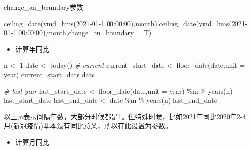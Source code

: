 \documentclass[
]{book}
\newenvironment{Shaded}{\begin{snugshade}}{\end{snugshade}}
\newcommand{\AttributeTok}[1]{\textcolor[rgb]{0.77,0.63,0.00}{#1}}
\newcommand{\CommentTok}[1]{\textcolor[rgb]{0.56,0.35,0.01}{\textit{#1}}}
\newcommand{\DecValTok}[1]{\textcolor[rgb]{0.00,0.00,0.81}{#1}}
\newcommand{\FunctionTok}[1]{\textcolor[rgb]{0.00,0.00,0.00}{#1}}
\newcommand{\NormalTok}[1]{#1}
\newcommand{\OtherTok}[1]{\textcolor[rgb]{0.56,0.35,0.01}{#1}}
\newcommand{\SpecialCharTok}[1]{\textcolor[rgb]{0.00,0.00,0.00}{#1}}
\newcommand{\StringTok}[1]{\textcolor[rgb]{0.31,0.60,0.02}{#1}}
\providecommand{\tightlist}{%
  \setlength{\itemsep}{0pt}\setlength{\parskip}{0pt}}
\begin{document}
change\_on\_boundary参数

\begin{Shaded}
\begin{Highlighting}[]
\FunctionTok{ceiling\_date}\NormalTok{(}\FunctionTok{ymd\_hms}\NormalTok{(}\StringTok{\textquotesingle{}2021{-}01{-}1 00:00:00\textquotesingle{}}\NormalTok{),}\StringTok{\textquotesingle{}month\textquotesingle{}}\NormalTok{)}
\FunctionTok{ceiling\_date}\NormalTok{(}\FunctionTok{ymd\_hms}\NormalTok{(}\StringTok{\textquotesingle{}2021{-}01{-}1 00:00:00\textquotesingle{}}\NormalTok{),}\StringTok{\textquotesingle{}month\textquotesingle{}}\NormalTok{,}\AttributeTok{change\_on\_boundary =}\NormalTok{ T)}
\end{Highlighting}
\end{Shaded}

\begin{itemize}
\tightlist
\item
  计算年同比
\end{itemize}

\begin{Shaded}
\begin{Highlighting}[]
\NormalTok{n }\OtherTok{\textless{}{-}} \DecValTok{1} 
\NormalTok{date }\OtherTok{\textless{}{-}} \FunctionTok{today}\NormalTok{()}
\CommentTok{\# current }
\NormalTok{current\_start\_date }\OtherTok{\textless{}{-}}  \FunctionTok{floor\_date}\NormalTok{(date,}\AttributeTok{unit =} \StringTok{\textquotesingle{}year\textquotesingle{}}\NormalTok{)}
\NormalTok{current\_start\_date}
\NormalTok{date }

\CommentTok{\# last year}
\NormalTok{last\_start\_date }\OtherTok{\textless{}{-}} \FunctionTok{floor\_date}\NormalTok{(date,}\AttributeTok{unit =} \StringTok{\textquotesingle{}year\textquotesingle{}}\NormalTok{) }\SpecialCharTok{\%m{-}\%} \FunctionTok{years}\NormalTok{(n)}
\NormalTok{last\_start\_date}
\NormalTok{last\_end\_date }\OtherTok{\textless{}{-}}\NormalTok{ date }\SpecialCharTok{\%m{-}\%} \FunctionTok{years}\NormalTok{(n)}
\NormalTok{last\_end\_date}
\end{Highlighting}
\end{Shaded}

以上,n表示间隔年数，大部分时候都是1。但特殊时候，比如2021年同比2020年2-4月(新冠疫情)基本没有同比意义，所以在此设置为参数。

\begin{itemize}
\tightlist
\item
  计算月同比
\end{itemize}
\end{document}

